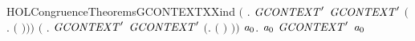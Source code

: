\begin{SaveVerbatim}{HOLCongruenceTheoremsGCONTEXTXXind}
       \ensuremath{(}\HOLSymConst{\HOLTokenForall{}} . \ensuremath{\HOLBoundVar{GCONTEXT}\sp{\prime}}  \HOLSymConst{\HOLTokenImp{}} \ensuremath{\HOLBoundVar{GCONTEXT}\sp{\prime}} \ensuremath{(}\HOLTokenLambda{}.   \ensuremath{(} \ensuremath{)}\ensuremath{)}\ensuremath{)} \HOLSymConst{\HOLTokenConj{}}
       \ensuremath{(}\HOLSymConst{\HOLTokenForall{}} . \ensuremath{\HOLBoundVar{GCONTEXT}\sp{\prime}}  \HOLSymConst{\HOLTokenImp{}} \ensuremath{\HOLBoundVar{GCONTEXT}\sp{\prime}} \ensuremath{(}\HOLTokenLambda{}.  \ensuremath{(} \ensuremath{)} \ensuremath{)}\ensuremath{)} \HOLSymConst{\HOLTokenImp{}}
       \HOLSymConst{\HOLTokenForall{}}\ensuremath{\HOLBoundVar{a}\sb{\mathrm{0}}}.  \ensuremath{\HOLBoundVar{a}\sb{\mathrm{0}}} \HOLSymConst{\HOLTokenImp{}} \ensuremath{\HOLBoundVar{GCONTEXT}\sp{\prime}} \ensuremath{\HOLBoundVar{a}\sb{\mathrm{0}}}
\end{SaveVerbatim}
\newcommand{\HOLCongruenceTheoremsGCONTEXTXXind}{\UseVerbatim{HOLCongruenceTheoremsGCONTEXTXXind}}
